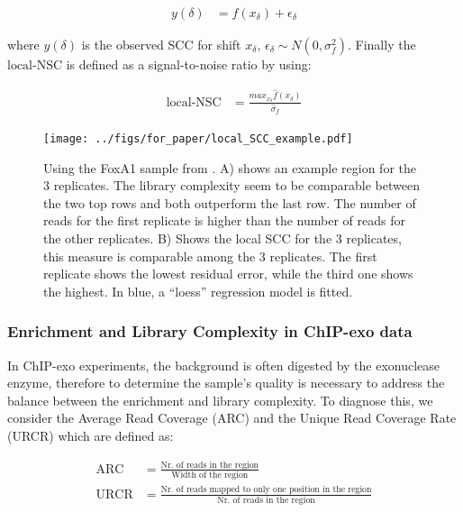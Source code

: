 \documentclass[11pt]{article}\usepackage[]{graphicx}\usepackage[]{color}
\begin{document}
\begin{align}
 y(\delta) &= f(x_\delta) + \epsilon_\delta \nonumber
\end{align}

where $y(\delta)$ is the observed SCC for shift $x_\delta$,
$\epsilon_\delta \sim N(0,\sigma_f^2)$. Finally the $\mbox{local-NSC}$
is defined as a signal-to-noise ratio by using:

\begin{align}
    \mbox{local-NSC} &= \frac{max_{x_\delta} \hat{f}(x_\delta)}{\hat{\sigma}_f} \label{locNSC}
\end{align}

\begin{figure}[H]
  \centering
  \texttt{[image: ../figs/for\_paper/local\_SCC\_example.pdf]}
  \caption{Using the FoxA1 sample from \cite{exoillumina}. A) shows an
    example region for the 3 replicates. The library complexity seem
    to be comparable between the two top rows and both outperform the
    last row. The number of reads for the first replicate is higher
    than the number of reads for the other replicates. B) Shows the
    local SCC for the 3 replicates, this measure is comparable among
    the 3 replicates. The first replicate shows the lowest residual
    error, while the third one shows the highest. In blue, a ``loess''
    regression model is fitted.}
\label{fig:locSCC}
\end{figure}

\subsubsection{Enrichment and Library Complexity in ChIP-exo data}
\label{sec:enri}

In ChIP-exo experiments, the background is often digested by the
exonuclease enzyme, therefore to determine the sample's quality is
necessary to address the balance between the enrichment and library
complexity. To diagnose this, we consider the Average Read Coverage
(ARC) and the Unique Read Coverage Rate (URCR) which are defined as:

\begin{align}
  \mbox{ARC} &= \frac{\text{Nr. of reads in the region}}{\text{Width of the region}} \nonumber \\
  \mbox{URCR} &= \frac{\text{Nr. of reads mapped to only one position
      in the region}}{\text{Nr. of reads in the region}} \nonumber
\end{align}
\end{document}

